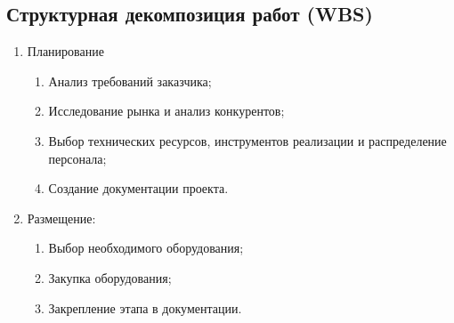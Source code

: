 \documentclass[14pt, russian]{matmex-diploma-custom}
\begin{document}
\subsection{Структурная декомпозиция работ (WBS)}
\begin{enumerate}
    \item Планирование
    \begin{enumerate}
        \item Анализ требований заказчика;
        \item Исследование рынка и анализ конкурентов;
        \item Выбор технических ресурсов, инструментов реализации и распределение персонала;
        \item Создание документации проекта.
    \end{enumerate}

    \item Размещение:
    \begin{enumerate}
        \item Выбор необходимого оборудования;
        \item Закупка оборудования;
        \item Закрепление этапа в документации.
    \end{enumerate}


\end{enumerate}
\end{document}
